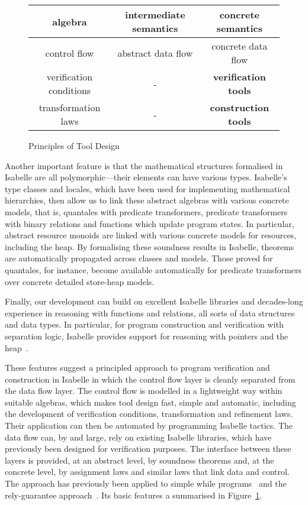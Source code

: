 \documentclass[twoside,runningheads,envcountsame,envcountsect,oribibl,orivec]{llncs}
\begin{document}
\begin{figure}[h]
  \centering 
\setlength{\tabcolsep}{10pt}
\renewcommand{\arraystretch}{2.2}
        \begin{tabular}{c|c|c}
algebra &  intermediate semantics   &  concrete semantics\\
\hline 
 control flow & abstract data flow & concrete data flow\\
 verification conditions  & - &
 \textbf{verification tools}\\
transformation laws & - &\textbf{construction tools}
        \end{tabular}
  \caption{Principles of Tool Design}
  \label{fig:design-principles}
\end{figure}



Another important feature is that the mathematical structures
formalised in Isabelle are all polymorphic---their elements can have
various types. Isabelle's type classes and locales, which have been
used for implementing mathematical hierarchies, then allow us to link
these abstract algebras with various concrete models, that is,
quantales with predicate transformers, predicate transformers with
binary relations and functions which update program states. In
particular, abstract resource monoids are linked with various concrete
models for resources, including the heap. By formalising these
soundness results in Isabelle, theorems are automatically propagated
across classes and models. Those proved for quantales, for instance,
become available automatically for predicate transformers over
concrete detailed store-heap models.

Finally, our development can build on excellent Isabelle libraries and
decades-long experience in reasoning with functions and relations, all
sorts of data structures and data types.  In particular, for program
construction and verification with separation logic, Isabelle provides
support for reasoning with pointers and the
heap~\cite{MehtaN05,Weber04}.

These features suggest a principled approach to program verification
and construction in Isabelle in which the control flow layer is
cleanly separated from the data flow layer.  The control flow is
modelled in a lightweight way within suitable algebras, which makes
tool design fast, simple and automatic, including the development of
verification conditions, transformation and refinement laws. Their
application can then be automated by programming Isabelle tactics.
The data flow can, by and large, rely on existing Isabelle libraries,
which have previously been designed for verification purposes. The
interface between these layers is provided, at an abstract level, by
soundness theorems and, at the concrete level, by assignment laws and
similar laws that link data and control. The approach has previously
been applied to simple while programs~\cite{sefm2014} and the
rely-guarantee approach~\cite{fm2014}.  Its
basic features a summarised in Figure~\ref{fig:design-principles}.
\end{document}
